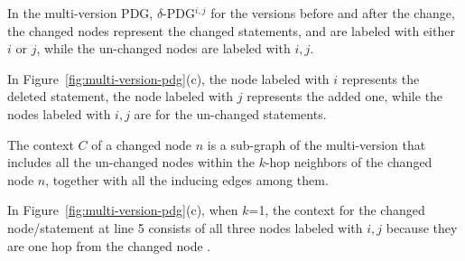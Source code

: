 \begin{Definition}
In the multi-version PDG, $\delta$-PDG$^{i,j}$ for the versions before
and after the change, the changed nodes represent the changed
statements, and are labeled with either $i$ or $j$, while the
un-changed nodes are labeled with $i,j$.
\end{Definition}

In Figure~\ref{fig:multi-version-pdg}(c), the node labeled with $i$
represents the deleted statement, the node labeled with $j$ represents
the added one, while the nodes labeled with $i,j$ are for the un-changed
statements.


\begin{Definition}[Context]
The context $C$ of a changed node $n$ is a sub-graph of the
multi-version {\mvpdg} that includes all the un-changed nodes within
the $k$-hop neighbors of the changed node $n$, together with all the
inducing edges among them.
\end{Definition}

In Figure~\ref{fig:multi-version-pdg}(c), when $k$=1, the context for
the changed node/statement at line 5 consists of all three nodes
labeled with $i,j$ because they are one hop from the changed node
.





